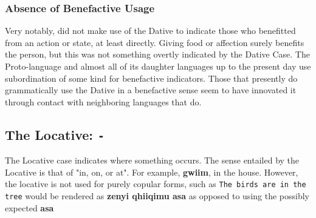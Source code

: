   \subsubsection{Absence of Benefactive Usage}
  Very notably, \langname did not make use of the Dative to indicate those who benefitted from an action or state, at least directly. Giving food or affection surely benefits the person, but this was not something overtly indicated by the Dative Case. The Proto-language and almost all of its daughter languages up to the present day use subordination of some kind for benefactive indicators. Those that presently do grammatically use the Dative in a benefactive sense seem to have innovated it through contact with neighboring languages that do.

\subsection{The Locative: \texttt{-\loc}}
The Locative case indicates where something occurs. The sense entailed by the Locative is that of "in, on, or at". For example, \textbf{gwiim\loc}, in the house. However, the locative is not used for purely copular forms, such as \texttt{The birds are in the tree} would be rendered as \textbf{zenyi qhiiqimu asa\acc} as opposed to using the possibly expected \textbf{asa\loc}
